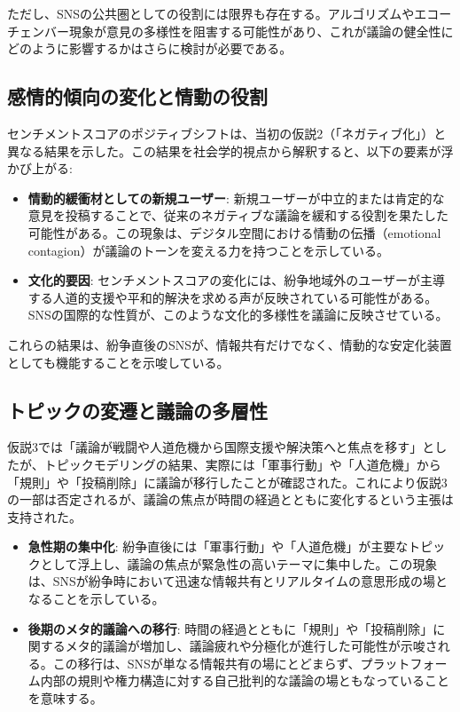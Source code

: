 \documentclass[11pt, a4j]{jreport}
\begin{document}
    ただし、SNSの公共圏としての役割には限界も存在する。アルゴリズムやエコーチェンバー現象\cite{pariser2011filter}が意見の多様性を阻害する可能性があり、これが議論の健全性にどのように影響するかはさらに検討が必要である。

    \subsection{感情的傾向の変化と情動の役割}
    センチメントスコアのポジティブシフトは、当初の仮説2（「ネガティブ化」）と異なる結果を示した。この結果を社会学的視点から解釈すると、以下の要素が浮かび上がる:

    \begin{itemize}
        \item \textbf{情動的緩衝材としての新規ユーザー}: 新規ユーザーが中立的または肯定的な意見を投稿することで、従来のネガティブな議論を緩和する役割を果たした可能性がある。この現象は、デジタル空間における情動の伝播（emotional contagion）\cite{kleinberg2020emotion}が議論のトーンを変える力を持つことを示している。
        \item \textbf{文化的要因}: センチメントスコアの変化には、紛争地域外のユーザーが主導する人道的支援や平和的解決を求める声が反映されている可能性がある。SNSの国際的な性質が、このような文化的多様性を議論に反映させている。
    \end{itemize}

    これらの結果は、紛争直後のSNSが、情報共有だけでなく、情動的な安定化装置としても機能することを示唆している。

    \subsection{トピックの変遷と議論の多層性}
    仮説3では「議論が戦闘や人道危機から国際支援や解決策へと焦点を移す」としたが、トピックモデリングの結果、実際には「軍事行動」や「人道危機」から「規則」や「投稿削除」に議論が移行したことが確認された。これにより仮説3の一部は否定されるが、議論の焦点が時間の経過とともに変化するという主張は支持された。

    \begin{itemize}
        \item \textbf{急性期の集中化}: 紛争直後には「軍事行動」や「人道危機」が主要なトピックとして浮上し、議論の焦点が緊急性の高いテーマに集中した。この現象は、SNSが紛争時において迅速な情報共有とリアルタイムの意思形成の場となることを示している。
        \item \textbf{後期のメタ的議論への移行}: 時間の経過とともに「規則」や「投稿削除」に関するメタ的議論が増加し、議論疲れ\cite{sunstein2001republic}や分極化が進行した可能性が示唆される。この移行は、SNSが単なる情報共有の場にとどまらず、プラットフォーム内部の規則や権力構造に対する自己批判的な議論の場ともなっていることを意味する。
    \end{itemize}
\end{document}
